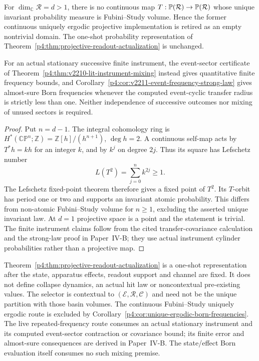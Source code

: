 \documentclass[12pt,a4paper]{article}
\begin{document}
\begin{corollary}
\label{p4:cor:unique-ergodic-born-frequencies}
For \(\dim_{\mathbb C}\mathcal R=d>1\), there is no continuous map
\(T:\mathbb{P}(\mathcal R)\to\mathbb{P}(\mathcal R)\) whose unique invariant probability
measure is Fubini--Study volume.  Hence the former continuous uniquely
ergodic projective implementation is retired as an empty nontrivial domain.
The one-shot probability representation of
Theorem~\ref{p4:thm:projective-readout-actualization} is unchanged.

For an actual stationary successive finite instrument, the event-sector
certificate of Theorem~\ref{p4:thm:v2210-lit-instrument-mixing} instead
gives quantitative finite frequency bounds, and
Corollary~\ref{p4:cor:v2211-event-frequency-strong-law} gives almost-sure
Born frequencies whenever the computed event-cyclic transfer radius is
strictly less than one.  Neither independence of successive outcomes nor
mixing of unused sectors is required.
\end{corollary}

\begin{proof}
Put \(n=d-1\).  The integral cohomology ring is
\(H^*(\mathbb{CP}^n;\mathbb Z)=\mathbb Z[h]/(h^{n+1})\),
\(\deg h=2\).  A continuous self-map acts by \(T^*h=kh\) for an integer
\(k\), and by \(k^j\) on degree \(2j\).  Thus its square has Lefschetz number
\[
 L(T^2)=\sum_{j=0}^{n}k^{2j}\ge1.
\]
The Lefschetz fixed-point theorem \cite[Theorem~2C.3]{hatcher2002algebraic}
therefore gives a fixed point of \(T^2\).  Its \(T\)-orbit has period one
or two and supports an invariant atomic probability.  This differs from
non-atomic Fubini--Study volume for \(n\ge1\), excluding the asserted
unique invariant law.  At \(d=1\) projective space is a point and the
statement is trivial.  The finite instrument claims follow from the cited
transfer-covariance calculation and the strong-law proof in Paper~IV-B; they use
actual instrument cylinder probabilities rather than a projective map.
\end{proof}

\begin{remark}
\label{p4:rem:actualization-status}
Theorem~\ref{p4:thm:projective-readout-actualization} is a one-shot
representation after the state, apparatus effects, readout support and
channel are fixed.  It does not define collapse dynamics, an actual hit law
or noncontextual pre-existing values.  The selector is contextual to
\((\mathcal E,\mathcal R,\mathcal C)\) and need not be the unique partition
with those basin volumes.  The continuous Fubini--Study uniquely ergodic
route is excluded by Corollary~\ref{p4:cor:unique-ergodic-born-frequencies}.
The live repeated-frequency route consumes an actual stationary instrument
and its computed event-sector contraction or covariance bound; its finite
error and almost-sure consequences are derived in Paper~IV-B. The state/effect
Born evaluation itself consumes no such mixing premise.
\end{remark}
\end{document}
